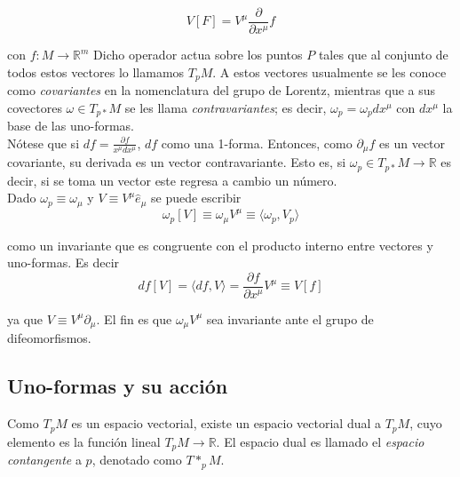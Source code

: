 \documentclass{report}
\begin{document}
\begin{equation}
V[F] = V^{\mu} \frac{\partial}{\partial x^{\mu}} f
\end{equation}

con $f : M \rightarrow \mathbb{R}^{m}$ Dicho operador actua sobre los puntos $P$ tales que al conjunto de todos estos vectores lo llamamos $T_{p}M$. A estos vectores usualmente se les conoce como \textit{covariantes} en la nomenclatura del grupo de Lorentz, mientras que a sus covectores $\omega \in T_{p*}M$ se les llama \textit{contravariantes}; es decir, $\omega _{p} = \omega_{p} dx^{\mu}$ con $dx^{\mu}$ la base de las uno-formas.\\

Nótese que si $df = \frac{\partial f}{x^{\mu} dx^{\mu}}$, $df$ como una 1-forma. Entonces, como $\partial _{\mu} f$ es un vector covariante, su derivada es un vector contravariante. Esto es, si $\omega _{p} \in T_{p*}M \rightarrow \mathbb{R}$ es decir, si se toma un vector este regresa a cambio un número.\\

Dado $\omega _{p} \equiv \omega _{\mu}$ y $V \equiv V^{\mu} \hat e_{\mu}$ se puede escribir\\

\begin{equation}
\omega _{p}[V] \equiv \omega_{\mu} V^{\mu} \equiv \langle \omega_{p},V_{p} \rangle
\end{equation}

como un invariante que es congruente con el producto interno entre vectores y uno-formas. Es decir\\

\begin{equation}
df[V] = \langle df, V\rangle = \frac{\partial f}{\partial x^{\mu}} V^{\mu} \equiv V[f]
\end{equation}

ya que $V \equiv V^{\mu} \partial_{\mu}$. El fin es que $\omega_{\mu} V^{\mu}$ sea invariante ante el grupo de difeomorfismos.\\

\subsection{Uno-formas y su acci\'on}


Como $T_{p}M$ es un espacio vectorial, existe un espacio vectorial dual a $T_{p}M$, cuyo elemento es la función lineal $T_{p}M \rightarrow \mathbb{R}$. El espacio dual es llamado el \textit{espacio contangente} a $p$, denotado como $T* _{p}M$.\\
\end{document}
